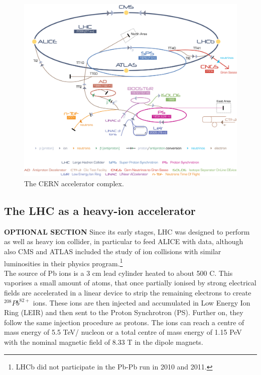 \begin{figure}[t]
\centering
\includegraphics[width=1.0\textwidth]{Images/Cern-Accelerator-Complex}
\caption[The CERN accelerator complex.]{The CERN accelerator complex.}
\label{Fig:cap3-1.1}
\end{figure}

\subsection{The LHC as a heavy-ion accelerator}
\label{par:3.1a}
\textbf{OPTIONAL SECTION}
Since its early stages, LHC was designed to perform as well as heavy ion collider, in particular to feed ALICE with data, although also CMS and ATLAS included the study of ion collisions with similar luminosities in their physics program.\footnote{LHCb did not participate in the Pb-Pb run in 2010 and 2011.}
\\
The source of Pb ions is a 3 cm lead cylinder heated to about 500 C. This vaporises a small amount of atoms, that once partially ionised by strong electrical fields are accelerated in a linear device to strip the remaining electrons to create $^{208}Pb^{82+}$ ions. These ions are then injected and accumulated in Low Energy Ion Ring (LEIR) and then sent to the Proton Synchrotron (PS). Further on, they follow the same injection procedure as protons. The ions can reach a centre of mass  energy of 5.5 TeV/ nucleon or a total centre of mass energy of 1.15 PeV with the nominal magnetic field of 8.33 T in the dipole magnets. 

